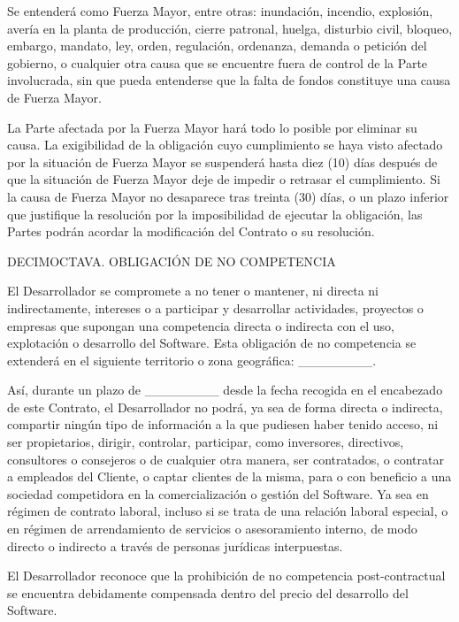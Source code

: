 \documentclass[a4paper,11pt]{report}
\begin{document}
	Se entenderá como Fuerza Mayor, entre otras: inundación, incendio,
	explosión, avería en la planta de producción, cierre patronal, huelga,
	disturbio civil, bloqueo, embargo, mandato, ley, orden, regulación,
	ordenanza, demanda o petición del gobierno, o cualquier otra causa que
	se encuentre fuera de control de la Parte involucrada, sin que pueda
	entenderse que la falta de fondos constituye una causa de Fuerza Mayor.
	
	La Parte afectada por la Fuerza Mayor hará todo lo posible por eliminar
	su causa. La exigibilidad de la obligación cuyo cumplimiento se haya
	visto afectado por la situación de Fuerza Mayor se suspenderá hasta diez
	(10) días después de que la situación de Fuerza Mayor deje de impedir o
	retrasar el cumplimiento. Si la causa de Fuerza Mayor no desaparece tras
	treinta (30) días, o un plazo inferior que justifique la resolución por
	la imposibilidad de ejecutar la obligación, las Partes podrán acordar la
	modificación del Contrato o su resolución.
	
	DECIMOCTAVA. OBLIGACIÓN DE NO COMPETENCIA
	
	El Desarrollador se compromete a no tener o mantener, ni directa ni
	indirectamente, intereses o a participar y desarrollar actividades,
	proyectos o empresas que supongan una competencia directa o indirecta
	con el uso, explotación o desarrollo del Software. Esta obligación de no
	competencia se extenderá en el siguiente territorio o zona geográfica:
	\_\_\_\_\_\_\_\_.
	
	Así, durante un plazo de \_\_\_\_\_\_\_\_ desde la fecha recogida en el
	encabezado de este Contrato, el Desarrollador no podrá, ya sea de forma
	directa o indirecta, compartir ningún tipo de información a la que
	pudiesen haber tenido acceso, ni ser propietarios, dirigir, controlar,
	participar, como inversores, directivos, consultores o consejeros o de
	cualquier otra manera, ser contratados, o contratar a empleados del
	Cliente, o captar clientes de la misma, para o con beneficio a una
	sociedad competidora en la comercialización o gestión del Software. Ya
	sea en régimen de contrato laboral, incluso si se trata de una relación
	laboral especial, o en régimen de arrendamiento de servicios o
	asesoramiento interno, de modo directo o indirecto a través de personas
	jurídicas interpuestas.
	
	El Desarrollador reconoce que la prohibición de no competencia
	post-contractual se encuentra debidamente compensada dentro del precio
	del desarrollo del Software.
	
\end{document}
